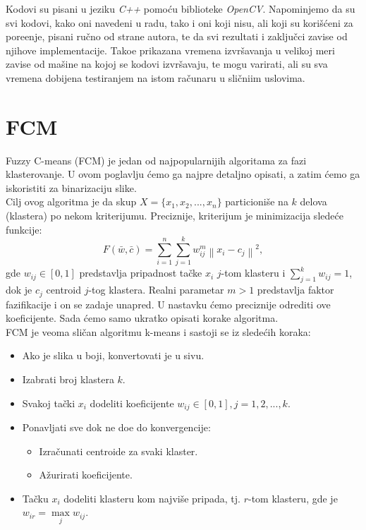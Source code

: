 \documentclass[12pt,a4paper]{article}
\theoremstyle{definition}
\theoremstyle{remark}
\theoremstyle{plain}
\begin{document}
Kodovi su pisani u jeziku \textit{C++} pomo\' cu biblioteke \textit{OpenCV}. Napominjemo da su svi kodovi, kako oni navedeni u radu, tako i oni koji nisu, ali koji su kori\v s\' ceni za pore\dj enje, pisani ru\v cno od strane autora, te da svi rezultati i zaklju\v cci zavise od njihove implementacije. Tako\dj e prikazana vremena izvr\v savanja u velikoj meri zavise od ma\v sine na kojoj se kodovi izvr\v savaju, te mogu varirati, ali su sva vremena dobijena testiranjem na istom ra\v cunaru u sli\v cniim uslovima.


\section{FCM}
\label{sec:FCM}
Fuzzy C-means (FCM) je jedan od najpopularnijih algoritama za fazi klasterovanje. U ovom poglavlju \' cemo ga najpre detaljno opisati, a zatim \' cemo ga iskoristiti za binarizaciju slike.\\

Cilj ovog algoritma je da skup $X=\{x_{1}, x_{2}, ..., x_{n}\}$ particioni\v se na $k$ delova (klastera) po 
nekom kriterijumu. Preciznije, kriterijum je minimizacija slede\' ce funkcije:
\begin{equation*}
 F(\bar{w}, \bar{c}) = \sum_{i=1}^{n}\sum_{j=1}^{k}w_{ij}^{m}\left\|x_{i}-c_{j}\right\|^{2},
\end{equation*}
gde $w_{ij}\in [0, 1]$ predstavlja pripadnost ta\v cke $x_{i}$ $j$-tom klasteru i $\sum_{j=1}^{k}w_{ij}=1$, dok je $c_{j}$ centroid $j$-tog klastera. Realni parametar $m>1$ predstavlja faktor fazifikacije i on se zadaje unapred.
U nastavku \' cemo preciznije odrediti ove koeficijente. Sada \' cemo samo ukratko opisati korake algoritma.\\

FCM je veoma sli\v can algoritmu k-means i sastoji se iz slede\' cih koraka:
\begin{itemize}
  \item Ako je slika u boji, konvertovati je u sivu. 
  \item Izabrati broj klastera $k$.
  \item Svakoj ta\v cki $x_{i}$ dodeliti koeficijente $w_{ij} \in [0, 1], j=1,2,..., k$.
  \item Ponavljati sve dok ne do\dj e do konvergencije:
    \begin{itemize}
      \item Izra\v cunati centroide za svaki klaster.
      \item A\v zurirati koeficijente.
    \end{itemize}
  \item Ta\v cku $x_{i}$ dodeliti klasteru kom najvi\v se pripada, tj. $r$-tom klasteru, gde je $w_{ir}=\max\limits_{j} w_{ij}$.
\end{itemize}
\end{document}
